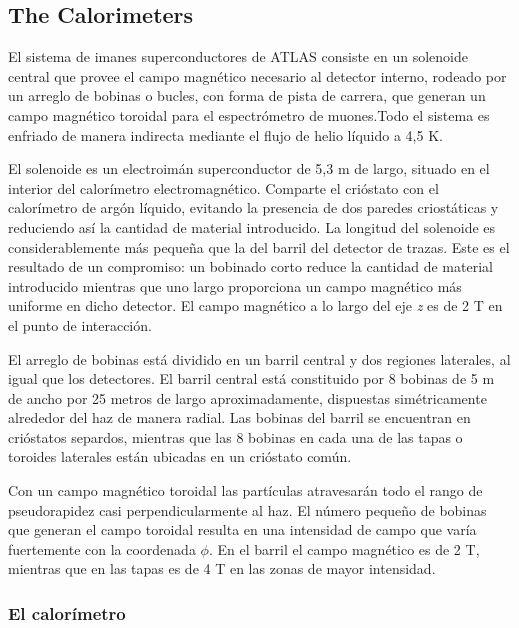 \subsection{The Calorimeters}\label{sec:atlasCALO}
 El sistema de imanes superconductores de ATLAS consiste en un solenoide central que provee el campo magn\'etico necesario al detector interno, rodeado por un arreglo de bobinas o bucles, con forma de pista de carrera, que generan un campo magn\'etico toroidal para el espectr\'ometro de muones.Todo el sistema es enfriado de manera indirecta mediante el flujo de helio l\'iquido a 4,5 K.

   El solenoide es un electroim\'an superconductor de 5,3 m de largo, situado en el interior del calor\'imetro electromagn\'etico. Comparte el cri\'ostato con el calor\'imetro de arg\'on l\'iquido, evitando la presencia de dos paredes criost\'aticas y reduciendo as\'i la cantidad de material introducido. La longitud del solenoide es considerablemente m\'as peque\~na que la del barril del detector de trazas. Este es el resultado de un compromiso: un bobinado corto reduce la cantidad de material introducido mientras que uno largo proporciona un campo magn\'etico m\'as uniforme en dicho detector. El campo magn\'etico a lo largo del eje \emph{z} es de 2 T en el punto de interacci\'on.

   El arreglo de bobinas est\'a dividido en un barril central y dos regiones laterales, al igual que los detectores. El barril central est\'a constituido por 8 bobinas de 5 m de ancho por 25 metros de largo aproximadamente, dispuestas sim\'etricamente alrededor del haz de manera radial. Las bobinas del barril se encuentran en cri\'ostatos separdos, mientras que las 8 bobinas en cada una de las tapas o toroides laterales est\'an ubicadas en un cri\'ostato com\'un.

   Con un campo magn\'etico toroidal las part\'iculas atravesar\'an todo el rango de pseudorapidez casi perpendicularmente al haz. El n\'umero peque\~no de bobinas que generan el campo toroidal resulta en una intensidad de campo que var\'ia fuertemente con la coordenada $\phi$. En el barril el campo magn\'etico es de 2 T, mientras que en las tapas es de 4 T en las zonas de mayor intensidad.   
    
\subsubsection{El calor\'imetro}

